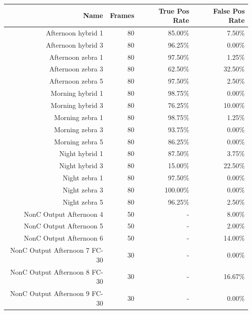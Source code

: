 \documentclass[12pt]{ucthesis}
\begin{document}
    \begin{longtable}{|r|r|r|r|}
    
        \hline
    Name  & Frames & True Pos Rate & False Pos Rate \bigstrut\\
    \hline
    Afternoon hybrid 1 & 80    & 85.00\% & 7.50\% \bigstrut\\
    \hline
    Afternoon hybrid 3 & 80    & 96.25\% & 0.00\% \bigstrut\\
    \hline
    Afternoon zebra 1 & 80    & 97.50\% & 1.25\% \bigstrut\\
    \hline
    Afternoon zebra 3 & 80    & 62.50\% & 32.50\% \bigstrut\\
    \hline
    Afternoon zebra 5 & 80    & 97.50\% & 2.50\% \bigstrut\\
    \hline
    Morning hybrid 1 & 80    & 98.75\% & 0.00\% \bigstrut\\
    \hline
    Morning hybrid 3 & 80    & 76.25\% & 10.00\% \bigstrut\\
    \hline
    Morning zebra 1 & 80    & 98.75\% & 1.25\% \bigstrut\\
    \hline
    Morning zebra 3 & 80    & 93.75\% & 0.00\% \bigstrut\\
    \hline
    Morning zebra 5 & 80    & 86.25\% & 0.00\% \bigstrut\\
    \hline
    Night hybrid 1 & 80    & 87.50\% & 3.75\% \bigstrut\\
    \hline
    Night hybrid 3 & 80    & 15.00\% & 22.50\% \bigstrut\\
    \hline
    Night zebra 1 & 80    & 97.50\% & 0.00\% \bigstrut\\
    \hline
    Night zebra 3 & 80    & 100.00\% & 0.00\% \bigstrut\\
    \hline
    Night zebra 5 & 80    & 96.25\% & 2.50\% \bigstrut\\
    \hline
    NonC Output Afternoon 4 & 50    & -     & 8.00\% \bigstrut\\
    \hline
    NonC Output Afternoon 5 & 50    & -     & 2.00\% \bigstrut\\
    \hline
    NonC Output Afternoon 6 & 50    & -     & 14.00\% \bigstrut\\
    \hline
    NonC Output Afternoon 7 FC-30 & 30    & -     & 0.00\% \bigstrut\\
    \hline
    NonC Output Afternoon 8 FC-30 & 30    & -     & 16.67\% \bigstrut\\
    \hline
    NonC Output Afternoon 9 FC-30 & 30    & -     & 0.00\% \bigstrut\\

\end{longtable}
\end{document}
